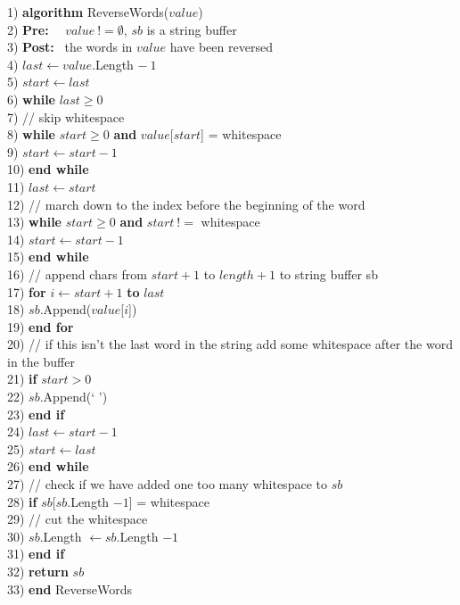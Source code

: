 \begin{tabbing}
1) \textbf{alg}\= \textbf{orithm} ReverseWords($value$) \\
2) \> \textbf{Pre:}~~ $value~!= \emptyset$, $sb$ is a string buffer \\
3) \> \textbf{Post:}~ the words in $value$ have been reversed \\
4) \> $last \leftarrow value$.Length $-~1$ \\
5) \> $start \leftarrow last$ \\
6) \> \textbf{whi}\= \textbf{le} $last \geq 0$ \\
7) \> \> // skip whitespace \\
8) \> \> \textbf{whi}\= \textbf{le} $start \geq 0$ \textbf{and} $value$[$start$] = whitespace \\
9) \> \> \> $start \leftarrow start - 1$ \\
10)\> \> \textbf{end while} \\
11)\> \> $last \leftarrow start$ \\
12)\> \> // march down to the index before the beginning of the word \\
13)\> \> \textbf{while} $start \geq 0$ \textbf{and} $start~!=$ whitespace \\
14)\> \> \> $start \leftarrow start - 1$ \\
15)\> \> \textbf{end while} \\
16)\> \> // append chars from $start + 1$ to $length + 1$ to string buffer sb \\
17)\> \> \textbf{for} $i \leftarrow start + 1$ \textbf{to} $last$ \\
18)\> \> \> $sb$.Append($value$[$i$]) \\
19)\> \> \textbf{end for} \\
20)\> \> // if this isn't the last word in the string add some whitespace after the word in the buffer \\
21)\> \> \textbf{if} $start > 0$ \\ 
22)\> \> \> $sb$.Append(` ') \\
23)\> \> \textbf{end if} \\
24)\> \> $last \leftarrow start - 1$ \\
25)\> \> $start \leftarrow last$ \\
26)\> \textbf{end while} \\
27)\> // check if we have added one too many whitespace to $sb$ \\
28)\> \textbf{if} $sb$[$sb$.Length $- 1$] = whitespace \\
29)\> \> // cut the whitespace \\
30)\> \> $sb$.Length $\leftarrow sb$.Length $- 1$ \\
31)\> \textbf{end if} \\
32)\> \textbf{return} $sb$ \\
33) \textbf{end} ReverseWords \\
\end{tabbing}
